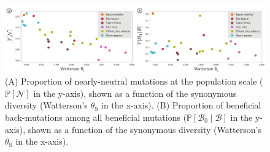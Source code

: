 \documentclass{article}
\newcommand{\proba}{\mathbb{P}}
\newcommand{\Sphy}{S_{0}}
\newcommand{\SphyBen}{\mathcal{B}_0}
\newcommand{\given}{\mid}
\newcommand{\Spop}{S}
\newcommand{\SpopNeu}{\mathcal{N}}
\newcommand{\SpopBen}{\mathcal{B}}
\newcommand{\thetaSyn}{\theta_{\text{S}}}
\begin{document}

    \begin{figure}[!ht]
        \centering
        \includegraphics[width=\textwidth, page=1] {artworks/figure.diversity}
        \caption{
            (A) Proportion of nearly-neutral mutations at the population scale ($\proba [ \SpopNeu]$ in the y-axis), shown as a function of the synonymous diversity (Watterson's $\thetaSyn$ in the x-axis).
            (B) Proportion of beneficial back-mutations among all beneficial mutations ($\proba [ \SphyBen  \given  \SpopBen]$ in the y-axis), shown as a function of the synonymous diversity (Watterson's $\thetaSyn$ in the x-axis).
        }
        \label{fig:diversity}
    \end{figure}
\end{document}
